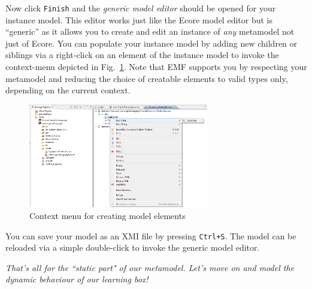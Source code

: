 Now click \texttt{Finish} and the \emph{generic model editor} should be opened for your instance model. 
This editor works just like the Ecore model editor but is ``generic'' as it allows you to create and edit an instance of \emph{any} metamodel not just of Ecore.
You can populate your instance model by adding new children or siblings via a right-click on an element of the instance model to invoke the context-menu depicted in Fig.~\ref{fig:create_instance}.
Note that EMF supports you by respecting your metamodel and reducing the choice of creatable elements to valid types only, depending on the current context. 

\begin{figure}[htbp]
	\centering 
  \includegraphics[width=0.7\textwidth]{pics/modelBrowserBilder/adjustModel.png} 
	\caption{Context menu for creating model elements}
	\label{fig:create_instance}
\end{figure}

You can save your model as an XMI file by pressing \texttt{Ctrl+S}. 
The model can be reloaded via a simple double-click to invoke the generic model editor. 

\textsl{That's all for the ``static part" of our metamodel. Let's move on and model the dynamic behaviour of our learning box!}


